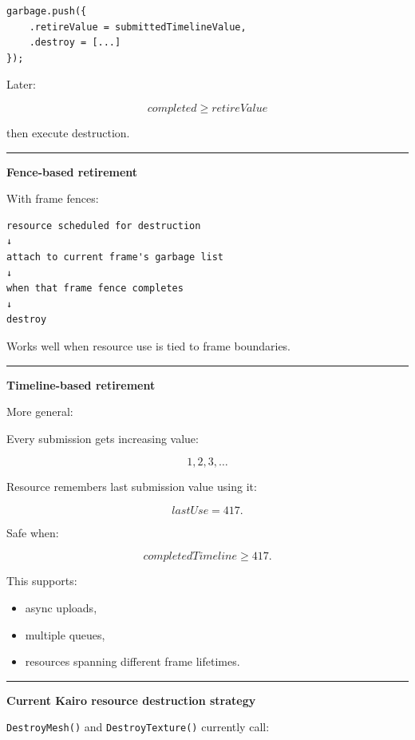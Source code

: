 \begin{verbatim}
garbage.push({
    .retireValue = submittedTimelineValue,
    .destroy = [...]
});
\end{verbatim}

Later:

\[
completed\ge retireValue
\]

then execute destruction.

\begin{center}\rule{0.5\linewidth}{0.5pt}\end{center}

\textbf{Fence-based retirement}

With frame fences:

\begin{verbatim}
resource scheduled for destruction
↓
attach to current frame's garbage list
↓
when that frame fence completes
↓
destroy
\end{verbatim}

Works well when resource use is tied to frame boundaries.

\begin{center}\rule{0.5\linewidth}{0.5pt}\end{center}

\textbf{Timeline-based retirement}

More general:

Every submission gets increasing value:

\[
1,2,3,\dots
\]

Resource remembers last submission value using it:

\[
lastUse=417.
\]

Safe when:

\[
completedTimeline\ge417.
\]

This supports:

\begin{itemize}
\tightlist
\item
  async uploads,
\item
  multiple queues,
\item
  resources spanning different frame lifetimes.
\end{itemize}

\begin{center}\rule{0.5\linewidth}{0.5pt}\end{center}

\textbf{Current Kairo resource destruction strategy}

\texttt{DestroyMesh()} and \texttt{DestroyTexture()} currently call:

